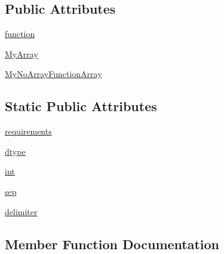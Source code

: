 \subsection*{Public Attributes}
\begin{DoxyCompactItemize}
\item 
\hyperlink{classnumpy_1_1core_1_1tests_1_1test__overrides_1_1TestArrayLike_aeaa55556625b6a898fd1d11df1c26f54}{function}
\item 
\hyperlink{classnumpy_1_1core_1_1tests_1_1test__overrides_1_1TestArrayLike_a607002c792280f4f297654c7e36bf304}{My\+Array}
\item 
\hyperlink{classnumpy_1_1core_1_1tests_1_1test__overrides_1_1TestArrayLike_a359ae86ae583e0725ce5a38555f676e5}{My\+No\+Array\+Function\+Array}
\end{DoxyCompactItemize}
\subsection*{Static Public Attributes}
\begin{DoxyCompactItemize}
\item 
\hyperlink{classnumpy_1_1core_1_1tests_1_1test__overrides_1_1TestArrayLike_a21c7e2ec102c37935a9622d88b7639b1}{requirements}
\item 
\hyperlink{classnumpy_1_1core_1_1tests_1_1test__overrides_1_1TestArrayLike_a0839bfc0f6f2bb28e08277b9b0dc3e3c}{dtype}
\item 
\hyperlink{classnumpy_1_1core_1_1tests_1_1test__overrides_1_1TestArrayLike_aa4f885f27d747cddb3ce85d64504a0e8}{int}
\item 
\hyperlink{classnumpy_1_1core_1_1tests_1_1test__overrides_1_1TestArrayLike_aff2f6989c715c4e15669e1dc5b3a1574}{sep}
\item 
\hyperlink{classnumpy_1_1core_1_1tests_1_1test__overrides_1_1TestArrayLike_aa2ab03d27a3af6e7387d33324530fd55}{delimiter}
\end{DoxyCompactItemize}


\subsection{Member Function Documentation}
\mbox{\label{classnumpy_1_1core_1_1tests_1_1test__overrides_1_1TestArrayLike_a625d68535f2fa5ea497eebe69c4814a6}} 
